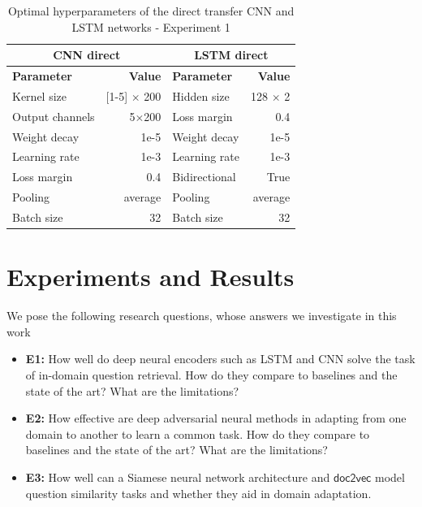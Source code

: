 \documentclass{sigkddExp}
\begin{document}
\begin{table}[b]
\begin{tabularx}{\columnwidth}{l|r|l|r}
      \multicolumn{2}{c|}{\textbf{CNN direct}}
     & \multicolumn{2}{c}{\textbf{LSTM direct}}
     \\
     \toprule
     \textbf{Parameter}
     & \textbf{Value}
     & \textbf{Parameter}
     & \textbf{Value}
     \\
     \midrule
     Kernel size
     & [1-5] $\times$ 200
     & Hidden size
     & 128 $\times$ 2
     \\
     Output channels
     & 5$\times$200
     & Loss margin
     & 0.4
     \\
     Weight decay
     & 1e-5 
     & Weight decay
     & 1e-5 
     \\
     Learning rate
     & 1e-3
     & Learning rate
     & 1e-3
     \\
     Loss margin
     & 0.4
     & Bidirectional
     & True
     \\
     Pooling
     & average
     & Pooling
     & average
     \\
     Batch size
     & 32
     & Batch size
     & 32
\end{tabularx}
\caption{Optimal hyperparameters of the direct transfer CNN and LSTM networks - Experiment 1}
\label{tab:param_direct}
\end{table}

\section{Experiments and Results}
\label{experiments}
We pose the following research questions, whose answers we investigate in this work
\begin{itemize}[topsep=0pt,itemsep=-1ex,partopsep=1ex,parsep=1ex]
\item \textbf{E1:} How well do deep neural encoders such as LSTM and CNN solve the task of in-domain question retrieval. How do they compare to baselines and the state of the art? What are the limitations?
\item \textbf{E2:} How effective are deep adversarial neural methods in adapting from one domain to another to learn a common task. How do they compare to baselines and the state of the art? What are the limitations?
\item {\color{red}\textbf{E3:} How well can a Siamese neural network architecture and $\mathsf{doc2vec}$ model question similarity tasks and whether they aid in domain adaptation.}
\end{itemize}
\end{document}
